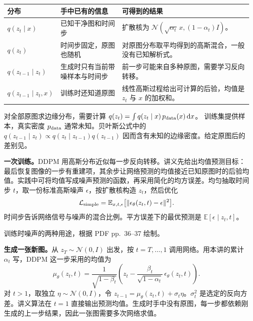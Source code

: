 \begin{center}
\small
\begin{tabularx}{\linewidth}{@{}lXX@{}}
\toprule
分布 & 手中已有的信息 & 可得到的结果 \\
\midrule
$q(z_t\mid x)$ & 已知干净图和时间步 & 扩散核为 $\mathcal N(\sqrt{\alpha_t}\,x,(1-\alpha_t)I)$。\\
$q(z_t)$ & 时间步固定，原图也随机 & 对原图分布取平均得到的高斯混合，一般没有已知解析式。\\
$q(z_{t-1}\mid z_t)$ & 生成时只有当前带噪样本与时间步 & 前一步可能来自多种原图，需要学习反向转移。\\
$q(z_{t-1}\mid z_t,x)$ & 训练时还知道原图 & 线性高斯过程给出可计算的后验，均值是 $z_t$ 与 $x$ 的加权和。\\
\bottomrule
\end{tabularx}
\end{center}

对全部原图求边缘分布，需要计算
\(
 q(z_t)=\int q(z_t\mid x)\,p_{\rm data}(x)\,\mathrm dx
\)。
训练集提供样本，真实密度 $p_{\rm data}$ 通常未知。贝叶斯公式中的 $q(z_{t-1}\mid z_t)\propto q(z_t\mid z_{t-1})q(z_{t-1})$ 因而含有未知的边缘密度。给定原图后的差别见。

\textbf{一次训练。}DDPM 用高斯分布近似每一步反向转移。讲义先给出均值预测目标：最后恢复图像的一步有重建项，其余步让网络预测的均值接近已知原图时的后验均值。实践中可将均值写成噪声预测的函数，再采用简化的均方误差。均匀抽取时间步 $t$，取一份标准高斯噪声 $\epsilon$，按扩散核构造 $z_t$，然后优化
\[
 \mathcal L_{\rm simple}=\mathbb E_{x,t,\epsilon}
 \bigl[\|\epsilon_\theta(z_t,t)-\epsilon\|^2\bigr].
\]
时间步告诉网络信号与噪声的混合比例。平方误差下的最优预测是 $\mathbb E[\epsilon\mid z_t,t]$。

\begin{center}
\parbox{\linewidth}{\centering\par
{\small 训练时噪声的两种用途，根据 PDF pp.~36--37 绘制。}}
\end{center}

\textbf{生成一张新图。}从 $z_T\sim\mathcal N(0,I)$ 出发，按 $t=T,\ldots,1$ 调用网络。用本讲的累计 $\alpha_t$ 写，DDPM 这一步采用的均值为
\[
 \mu_\theta(z_t,t)=\frac{1}{\sqrt{1-\beta_t}}
 \left(z_t-\frac{\beta_t}{\sqrt{1-\alpha_t}}\,\epsilon_\theta(z_t,t)\right).
\]
对 $t>1$，取独立 $\eta\sim\mathcal N(0,I)$，令 $z_{t-1}=\mu_\theta(z_t,t)+\sigma_t\eta$。$\sigma_t^2$ 是选定的反向方差。讲义算法在 $t=1$ 直接输出预测均值。生成时手中没有原图，每一步都依赖刚生成的上一步结果，因此一张图需要多次网络求值。

